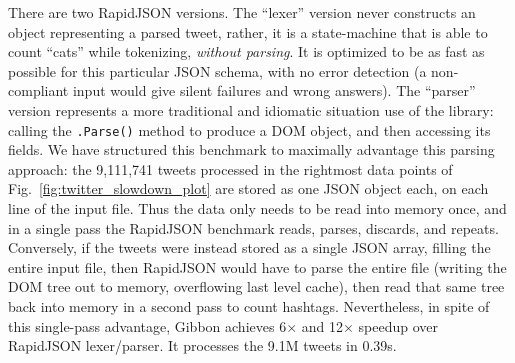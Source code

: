 \documentclass[showabstract,showacknowledgments,showpreface,showdedication,school]{iuphd}
\theoremstyle{nonumberplain}
\newcommand{\figref}[1]{Fig.~\ref{#1}}
\newcommand{\il}[1]{\lstinline[style=inline,mathescape=true];#1;}
\begin{document}
There are two RapidJSON versions. The ``lexer'' version never constructs an
object representing a parsed tweet, rather, it is a state-machine
that is able to count ``cats'' while tokenizing, {\em without parsing}.  It is
optimized to be as fast as possible for this particular JSON schema, with no
error detection (a non-compliant input would give silent failures and wrong
answers).
The ``parser'' version represents a more traditional and idiomatic situation use
of the library: calling the \il{.Parse()} method to produce a DOM object, and
then accessing its fields.
We have structured this benchmark to maximally advantage this parsing approach:
the 9,111,741 tweets processed in the rightmost data points of \figref{fig:twitter_slowdown_plot} are stored as one JSON object each, on each line of the input file.
Thus the data only needs to be read into memory once, and in a single pass the RapidJSON benchmark reads, parses, discards, and repeats.
Conversely, if the tweets were instead stored as a single JSON array, filling
the entire input file, then RapidJSON would have to parse the entire file
(writing the DOM tree out to memory, overflowing last level cache), then read
that same tree back into memory in a second pass to count hashtags.
Nevertheless, in spite of this single-pass advantage, Gibbon achieves
6$\times$ and 12$\times$ speedup over RapidJSON lexer/parser.
It processes the 9.1M tweets in 0.39s.
\end{document}
